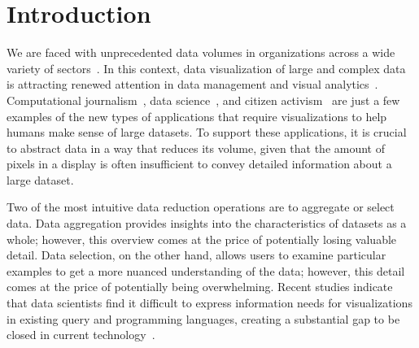 \documentclass[11pt, oneside]{report}
\begin{document}
\section{Introduction}
\label{sec:glossy:introduction}

We are faced with unprecedented data volumes in organizations across a wide variety of sectors~\cite{MCB+11:McKinsey}. In this context, data visualization of large and complex data is attracting renewed attention in data management and visual analytics~\cite{FeketeS12:DMVisChallenges,hanrahan:enthusiast,wu:case}. Computational journalism~\cite{CohenHT:2011:CompJournalism}, data science~\cite{KandelPHH12:InterviewStudy}, and citizen activism~\cite{ViegasM:2009:ManyEyes} are just a few examples of the new types of applications that require visualizations to help humans make sense of large datasets. To support these applications, it is crucial to abstract data in a way that reduces its volume, given that the amount of pixels in a display is often insufficient to convey detailed information about a large dataset.

Two of the most intuitive data reduction operations are to aggregate or select data. Data aggregation provides insights into the characteristics of datasets as a whole; however, this overview comes at the price of potentially losing valuable detail. Data selection, on the other hand, allows users to examine particular examples to get a more nuanced understanding of the data; however, this detail comes at the price of potentially being overwhelming. Recent studies indicate that data scientists find it difficult to express information needs for visualizations in existing query and programming languages, creating a substantial gap to be closed in current technology~\cite{KandelPHH12:InterviewStudy}.
 
\end{document}
